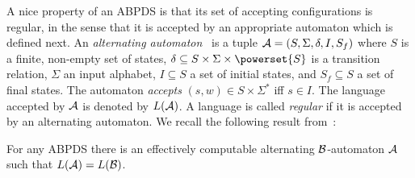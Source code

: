 \documentclass{llncs}
\begin{document}
A nice property of an ABPDS is that its set of accepting configurations is regular, in the sense that it is accepted by an appropriate automaton which is defined next. An \emph{alternating automaton}~\cite{bouajjani1997reachability} is a tuple $\mathcal{A}=(S,\Sigma,\delta, I, S_f)$ where  $S$ is a finite, non-empty set of states,  $\delta\subseteq S\times \Sigma\times\powerset{S}$ is a transition relation, $\Sigma$ an input alphabet, $I\subseteq S$ a set of initial states, and $S_f\subseteq S$ a set of final states.   The automaton \emph{accepts} $(s,w)\in S\times\Sigma^*$ iff  $s\in I$. The  language accepted by $\mathcal{A}$ is denoted by $L(\mathcal{A})$. A language is called \emph{regular} if it is accepted by an alternating automaton.  We recall the following result from~\cite{song2014efficient}:

\vspace{-1ex}
\begin{theorem}\label{theo:song1}
For any  ABPDS \ABPDS there is an effectively computable alternating $\mathcal{B}$-automaton $\mathcal{A}$ such that $L(\mathcal{A})=L(\mathcal{B})$.
\end{theorem}
\end{document}
